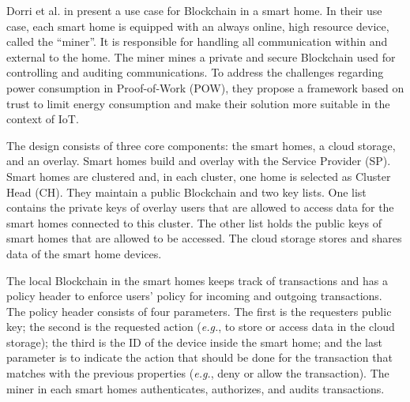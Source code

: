 Dorri et al. in \cite{Dorri2017SmartHome} present a use case for Blockchain in a smart home. In their use case, each smart home is equipped with an always online, high resource device, called the ``miner''. It is responsible for handling all communication within and external to the home.
The miner mines a private and secure Blockchain used for controlling and auditing communications. To address the challenges regarding power consumption in Proof-of-Work (POW), they propose a framework based on trust to limit energy consumption and make their solution more suitable in the context of IoT.

The design consists of three core components: the smart homes, a cloud storage, and an overlay.
Smart homes build and overlay with the Service Provider (SP). Smart homes are clustered and, in each cluster, one home is selected as Cluster Head (CH).
They maintain a public Blockchain and two key lists. One list contains the private keys of overlay users that are allowed to access data for the smart homes connected to this cluster.
The other list holds the public keys of smart homes that are allowed to be accessed.
The cloud storage stores and shares data of the smart home devices.

The local Blockchain in the smart homes keeps track of transactions and has a policy header to enforce users' policy for incoming and outgoing transactions.
The policy header consists of four parameters. The first is the requesters public key; the second is the requested action (\textit{e.g.}, to store or access data in the cloud storage); the third is the ID of the device inside the smart home; and the last parameter is to indicate the action that should be done for the transaction that matches with the previous properties (\textit{e.g.}, deny or allow the transaction).
The miner in each smart homes authenticates, authorizes, and audits transactions.
